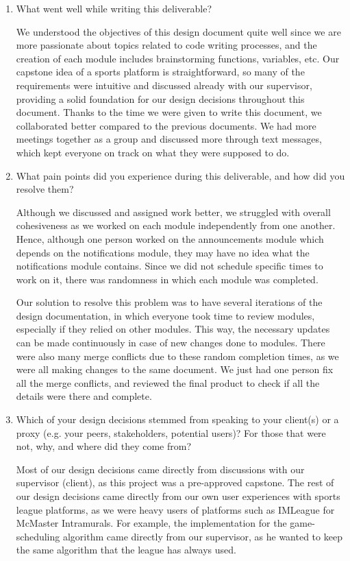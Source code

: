 \documentclass[12pt, titlepage]{article}
\begin{document}
\begin{enumerate}
  \item What went well while writing this deliverable?
  
  We understood the objectives of this design document quite well since we are more passionate about topics related to code writing processes, and the creation of each module includes brainstorming functions, variables, etc. Our capstone idea of a sports platform is straightforward, so many of the requirements were intuitive and discussed already with our supervisor, providing a solid foundation for our design decisions throughout this document. Thanks to the time we were given to write this document, we collaborated better compared to the previous documents. We had more meetings together as a group and discussed more through text messages, which kept everyone on track on what they were supposed to do.
  
  \item What pain points did you experience during this deliverable, and how
        did you resolve them?

  Although we discussed and assigned work better, we struggled with overall cohesiveness as we worked on each module independently from one another. Hence, although one person worked on the announcements module which depends on the notifications module, they may have no idea what the notifications module contains. Since we did not schedule specific times to work on it, there was randomness in which each module was completed. 
  
  Our solution to resolve this problem was to have several iterations of the design documentation, in which everyone took time to review modules, especially if they relied on other modules. This way, the necessary updates can be made continuously in case of new changes done to modules. There were also many merge conflicts due to these random completion times, as we were all making changes to the same document. We just had one person fix all the merge conflicts, and reviewed the final product to check if all the details were there and complete.

  \item Which of your design decisions stemmed from speaking to your client(s)
        or a proxy (e.g. your peers, stakeholders, potential users)? For those that
        were not, why, and where did they come from?

  Most of our design decisions came directly from discussions with our supervisor (client), as this project was a pre-approved capstone. The rest of our design decisions came directly from our own user experiences with sports league platforms, as we were heavy users of platforms such as IMLeague for McMaster Intramurals. For example, the implementation for the game-scheduling algorithm came directly from our supervisor, as he wanted to keep the same algorithm that the league has always used. 


\end{enumerate}
\end{document}
